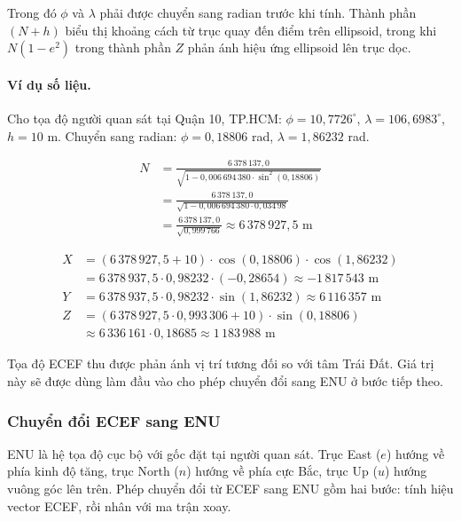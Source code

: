 Trong đó $\phi$ và $\lambda$ phải được chuyển sang radian trước khi tính. Thành phần $(N + h)$ biểu thị khoảng cách từ trục quay đến điểm trên ellipsoid, trong khi $N(1 - e^2)$ trong thành phần $Z$ phản ánh hiệu ứng ellipsoid lên trục dọc.

\paragraph{Ví dụ số liệu.\\} Cho tọa độ người quan sát tại Quận 10, TP.HCM: $\phi = 10{,}7726^\circ$, $\lambda = 106{,}6983^\circ$, $h = 10$ m. Chuyển sang radian: $\phi = 0{,}18806$ rad, $\lambda = 1{,}86232$ rad.

\begin{align*}
    N &= \frac{6\,378\,137{,}0}{\sqrt{1 - 0{,}006\,694\,380 \cdot \sin^2(0{,}18806)}} \\
      &= \frac{6\,378\,137{,}0}{\sqrt{1 - 0{,}006\,694\,380 \cdot 0{,}034\,98}} \\
      &= \frac{6\,378\,137{,}0}{\sqrt{0{,}999\,766}} \approx 6\,378\,927{,}5 \text{ m}
\end{align*}

\begin{align*}
    X &= (6\,378\,927{,}5 + 10) \cdot \cos(0{,}18806) \cdot \cos(1{,}86232) \\
      &= 6\,378\,937{,}5 \cdot 0{,}98232 \cdot (-0,28654) \approx -1\,817\,543 \text{ m} \\
    Y &= 6\,378\,937{,}5 \cdot 0{,}98232 \cdot \sin(1{,}86232) \approx 6\,116\,357 \text{ m} \\
    Z &= (6\,378\,927{,}5 \cdot 0{,}993\,306 + 10) \cdot \sin(0{,}18806) \\
      &\approx 6\,336\,161 \cdot 0{,}18685 \approx 1\,183\,988 \text{ m}
\end{align*}

Tọa độ ECEF thu được phản ánh vị trí tương đối so với tâm Trái Đất. Giá trị này sẽ được dùng làm đầu vào cho phép chuyển đổi sang ENU ở bước tiếp theo.

\subsubsection{Chuyển đổi ECEF sang ENU}

\hspace{0.5cm} ENU là hệ tọa độ cục bộ với gốc đặt tại người quan sát. Trục East ($e$) hướng về phía kinh độ tăng, trục North ($n$) hướng về phía cực Bắc, trục Up ($u$) hướng vuông góc lên trên. Phép chuyển đổi từ ECEF sang ENU gồm hai bước: tính hiệu vector ECEF, rồi nhân với ma trận xoay.

